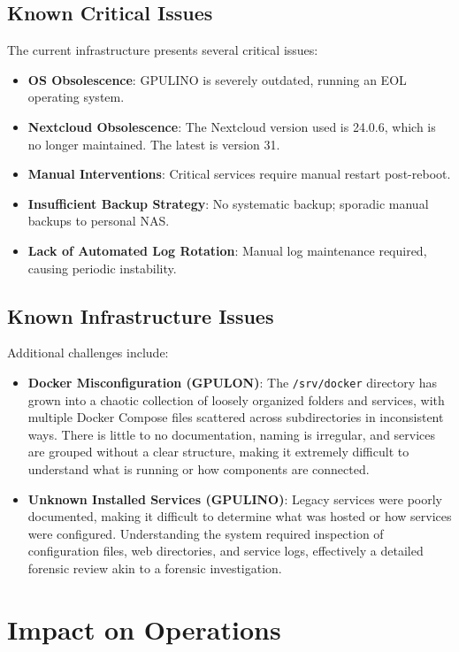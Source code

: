 \subsection*{Known Critical Issues}

The current infrastructure presents several critical issues:
\begin{itemize}
  \item \textbf{OS Obsolescence}: GPULINO is severely outdated, running an EOL operating system.
  \item \textbf{Nextcloud Obsolescence}: The Nextcloud version used is 24.0.6, which is no longer maintained. The latest is version 31.
  \item \textbf{Manual Interventions}: Critical services require manual restart post-reboot.
  \item \textbf{Insufficient Backup Strategy}: No systematic backup; sporadic manual backups to personal NAS.
  \item \textbf{Lack of Automated Log Rotation}: Manual log maintenance required, causing periodic instability.
\end{itemize}

\subsection*{Known Infrastructure Issues}

Additional challenges include:
\begin{itemize}
  \item \textbf{Docker Misconfiguration (GPULON)}: The \texttt{/srv/docker} directory has grown into a chaotic collection of loosely organized folders and services, with multiple Docker Compose files scattered across subdirectories in inconsistent ways. There is little to no documentation, naming is irregular, and services are grouped without a clear structure, making it extremely difficult to understand what is running or how components are connected.
  \item \textbf{Unknown Installed Services (GPULINO)}: Legacy services were poorly documented, making it difficult to determine what was hosted or how services were configured. Understanding the system required inspection of configuration files, web directories, and service logs, effectively a detailed forensic review akin to a forensic investigation.
\end{itemize}

\section{Impact on Operations}

